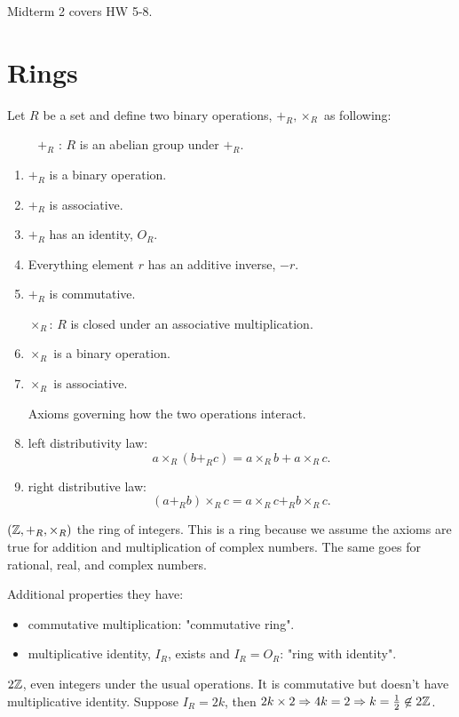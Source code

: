 \documentclass[class=article,crop=false]{standalone}
\begin{document}
Midterm 2 covers HW 5-8.

\section{Rings}

\begin{defn}[ring]
Let $ R$ be a set and define two binary operations,  $ +_{ R}, \times_R $ as following:

$\ \  \qquad  +_{ R} $ : $ R$ is an abelian group under  $ +_{ R} $.
\begin{enumerate}[label=\arabic*)]
	\item $ +_{ R} $ is a binary operation.
	\item $ +_{ R} $ is associative.
	\item $ +_{ R} $ has an identity, $ O_R$.
	\item Everything element  $ r$ has an additive inverse,  $ -r$.
	\item  $ +_{ R} $ is commutative.

$ \times_R $: $ R$ is closed under an associative multiplication.
	\item $ \times_R $ is a binary operation.
	\item $ \times _R$ is associative.

Axioms governing how the two operations interact.
\item left distributivity law: $ $
\[
 a \times _R(b+_{ R}c ) = a\times _R b + a\times _R c
.\] 
\item right distributive law:
	\[
		(a+_{ R} b )\times _R c = a \times _R c +_{ R} b \times _R c  
	.\] 
\end{enumerate}
\end{defn}
\begin{eg}[]
	$ (\mathbb{Z}, +_{ R}, \times _R) $ the ring of integers. This is a ring because we assume the axioms are true for addition and multiplication of complex numbers. The same goes for rational, real, and complex numbers.

	Additional properties they have:
	\begin{itemize}
		\item commutative multiplication: "commutative ring".
		\item multiplicative identity, $ I_R$, exists and $I_R = O_R$: "ring with identity".
	\end{itemize}
\end{eg}

\begin{eg}[]
$ 2\mathbb{Z}$, even integers under the usual operations. It is commutative but doesn't have multiplicative identity. Suppose $ I_R= 2k$, then $ 2k \times 2 \Rightarrow 4k= 2 \Rightarrow k=\frac{1}{2} \not\in 2\mathbb{Z}$. 
\end{eg}
\end{document}

